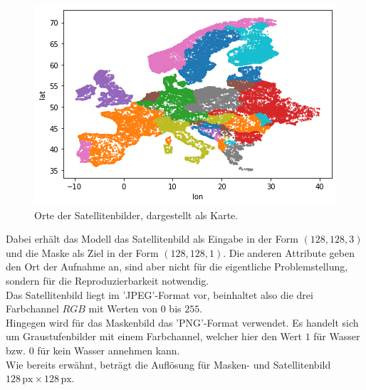 \begin{figure}
    \centering
    \includegraphics[scale=0.5]{content/img/map.png}
    \caption{Orte der Satellitenbilder, dargestellt als Karte.}
\end{figure}
\FloatBarrier
Dabei erhält das Modell das Satellitenbild als Eingabe in der Form $(128, 128, 3)$ und die Maske als Ziel in der Form $(128, 128, 1)$.
Die anderen Attribute geben den Ort der Aufnahme an, sind aber nicht für die eigentliche Problemstellung, sondern für die Reproduzierbarkeit notwendig.
\\
Das Satellitenbild liegt im 'JPEG'-Format vor, beinhaltet also die drei Farbchannel $RGB$ mit Werten von $0$ bis $255$.
\\
Hingegen wird für das Maskenbild das 'PNG'-Format verwendet.
Es handelt sich um Graustufenbilder mit einem Farbchannel, welcher hier den Wert $1$ für Wasser bzw. $0$ für kein Wasser annehmen kann.
\\
Wie bereits erwähnt, beträgt die Auflösung für Masken- und Satellitenbild $128 \, \text{px} \times 128 \, \text{px}$.
